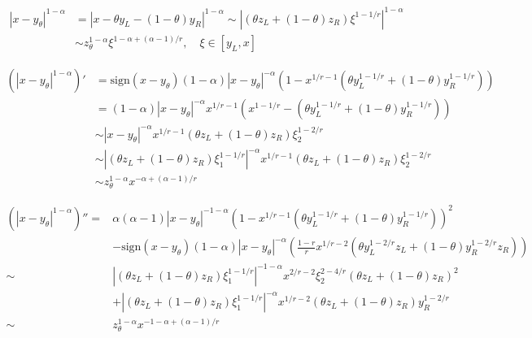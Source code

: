 \documentclass{ctexart}
\begin{document}
\begin{equation}
    \begin{aligned}
        |x-y_\theta|^{1-\alpha} &= |x-\theta y_L - (1-\theta) y_R |^{1-\alpha} \sim | (\theta z_L + (1-\theta) z_R) \xi^{1-1/r} |^{1-\alpha}  \\
        &\sim z_\theta^{1-\alpha} \xi^{1-\alpha + (\alpha-1)/r}, \quad \xi\in [y_L, x]
    \end{aligned}
\end{equation}

\begin{equation}
    \begin{aligned}
        (|x-y_\theta|^{1-\alpha})' &= \text{sign}(x-y_\theta)(1-\alpha)|x-y_\theta|^{-\alpha}(1-x^{1/r-1}(\theta y_L^{1-1/r} + (1-\theta)y_R^{1-1/r}))     \\
        & = (1-\alpha)|x-y_\theta|^{-\alpha}x^{1/r-1} (x^{1-1/r} - (\theta y_L^{1-1/r} + (1-\theta)y_R^{1-1/r})) \\
        & \sim |x-y_\theta|^{-\alpha} x^{1/r-1} (\theta z_L + (1-\theta) z_R) \xi_2^{1-2/r} \\
        & \sim | (\theta z_L + (1-\theta) z_R) \xi_1^{1-1/r} |^{-\alpha} x^{1/r-1} (\theta z_L + (1-\theta) z_R)\xi_2^{1-2/r} \\
        & \sim z_\theta^{1-\alpha} x^{-\alpha + (\alpha-1)/r}
    \end{aligned}
\end{equation}

\begin{equation}
    \begin{aligned}
        (|x-y_\theta|^{1-\alpha})'' 
        = & \alpha(\alpha-1)|x-y_\theta|^{-1-\alpha} (1-x^{1/r-1}(\theta y_L^{1-1/r} + (1-\theta)y_R^{1-1/r}))^2 \\
            &- \text{sign}(x-y_\theta)(1-\alpha)|x-y_\theta|^{-\alpha}(\frac{1-r}{r} x^{1/r-2} (\theta y_L^{1-2/r} z_L + (1-\theta) y_R^{1-2/r} z_R))  \\
        \sim & | (\theta z_L + (1-\theta) z_R) \xi_1^{1-1/r} |^{-1-\alpha} x^{2/r-2} \xi_2^{2-4/r} (\theta z_L + (1-\theta) z_R)^2 \\
            &+ | (\theta z_L + (1-\theta) z_R) \xi_1^{1-1/r} |^{-\alpha} x^{1/r-2} (\theta z_L + (1-\theta) z_R)y_R^{1-2/r}   \\
        \sim & z_\theta^{1-\alpha} x^{-1-\alpha + (\alpha-1)/r}
    \end{aligned}
\end{equation}
\end{document}
